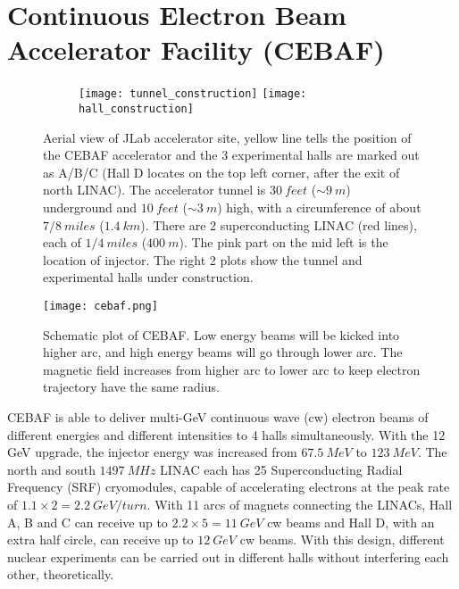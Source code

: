 \section{Continuous Electron Beam Accelerator Facility (CEBAF)}
\begin{figure}[h!]
    \begin{subfigure}[b]{0.59\textwidth}
    \end{subfigure}
    \begin{subfigure}[b]{0.5\textwidth}
	\texttt{[image: tunnel\_construction]}
	\texttt{[image: hall\_construction]}
    \end{subfigure}

    \caption{Aerial view of JLab accelerator site, yellow line tells the position
    of the CEBAF accelerator and the 3 experimental halls are marked out as A/B/C 
    (Hall D locates on the top left corner, after the exit of north LINAC).
    The accelerator tunnel is $30 \ feet$ ($\sim 9 \ m$) underground and $10 \ feet$ ($\sim 3 \ m$) 
    high, with a circumference of about $7/8\ miles$ ($1.4\ km$). There are 2 superconducting 
    LINAC (red lines), each of $1/4\ miles$ ($400\ m$). The pink part on the mid
    left is the location of injector. The right 2 plots show the tunnel and 
    experimental halls under construction.}
\end{figure}

\begin{figure}[h!]
    \texttt{[image: cebaf.png]}
    \caption{Schematic plot of CEBAF. Low energy beams will be kicked into 
    higher arc, and high energy beams will go through lower arc. The magnetic
    field increases from higher arc to lower arc to keep electron trajectory 
    have the same radius.}
    \label{fig:cebaf}
\end{figure}
CEBAF is able to deliver multi-GeV continuous wave (cw) electron beams of different
energies and different intensities to 4 halls simultaneously.
With the 12 GeV upgrade, the injector energy was increased from $67.5\ MeV$ to 
$123\ MeV$. The north and south $1497\ MHz$ LINAC each has 25 
Superconducting Radial Frequency (SRF) cryomodules, capable of accelerating 
electrons at the peak rate of $1.1 \times 2 = 2.2\ GeV/turn$. With 11 arcs of magnets
connecting the LINACs, Hall A, B and C can receive up
to $2.2 \times 5 = 11 \ GeV$ cw beams and Hall D, with an extra half circle,
can receive up to $12\ GeV$ cw beams. With this design, different nuclear 
experiments can be carried out in different halls without interfering each other,
theoretically.

